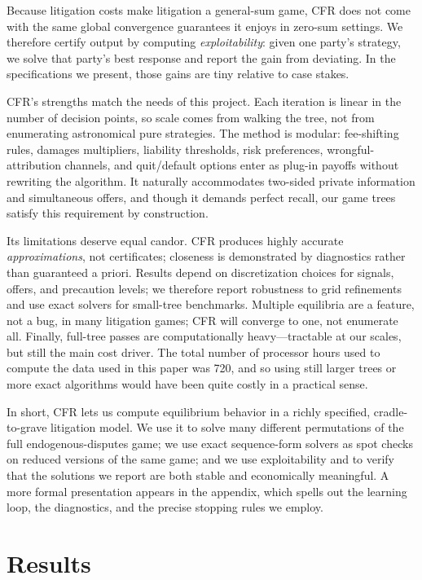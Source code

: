 \documentclass{article}
\begin{document}
Because litigation costs make litigation a general-sum game, CFR does not come with the same global convergence guarantees it enjoys in zero-sum settings. We therefore certify output by computing \emph{exploitability}: given one party’s strategy, we solve that party’s best response and report the gain from deviating. In the specifications we present, those gains are tiny relative to case stakes. 

CFR’s strengths match the needs of this project. Each iteration is linear in the number of decision points, so scale comes from walking the tree, not from enumerating astronomical pure strategies. The method is modular: fee-shifting rules, damages multipliers, liability thresholds, risk preferences, wrongful-attribution channels, and quit/default options enter as plug-in payoffs without rewriting the algorithm. It naturally accommodates two-sided private information and simultaneous offers, and though it demands perfect recall, our game trees satisfy this requirement by construction.

Its limitations deserve equal candor. CFR produces highly accurate \emph{approximations}, not certificates; closeness is demonstrated by diagnostics rather than guaranteed a priori. Results depend on discretization choices for signals, offers, and precaution levels; we therefore report robustness to grid refinements and use exact solvers for small-tree benchmarks. Multiple equilibria are a feature, not a bug, in many litigation games; CFR will converge to one, not enumerate all. Finally, full-tree passes are computationally heavy—tractable at our scales, but still the main cost driver. The total number of processor hours used to compute the data used in this paper was 720, and so using still larger trees or more exact algorithms would have been quite costly in a practical sense.

In short, CFR lets us compute equilibrium behavior in a richly specified, cradle-to-grave litigation model. We use it to solve many different permutations of the full endogenous-disputes game; we use exact sequence-form solvers as spot checks on reduced versions of the same game; and we use exploitability and to verify that the solutions we report are both stable and economically meaningful. A more formal presentation appears in the appendix, which spells out the learning loop, the diagnostics, and the precise stopping rules we employ.

\section{Results}
\end{document}

